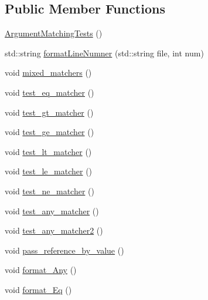 \subsection*{Public Member Functions}
\begin{DoxyCompactItemize}
\item 
\mbox{\hyperlink{structArgumentMatchingTests_a605a94720d45e2d2d1fec3cdd674c9f8}{Argument\+Matching\+Tests}} ()
\item 
std\+::string \mbox{\hyperlink{structArgumentMatchingTests_a7bb972e769e34e490cad0b68f4c780db}{format\+Line\+Numner}} (std\+::string file, int num)
\item 
void \mbox{\hyperlink{structArgumentMatchingTests_a8356a25840501e225661721b3b9f2007}{mixed\+\_\+matchers}} ()
\item 
void \mbox{\hyperlink{structArgumentMatchingTests_a3069b8bcc915ffba02ee51cff4094ca9}{test\+\_\+eq\+\_\+matcher}} ()
\item 
void \mbox{\hyperlink{structArgumentMatchingTests_aa570edf4798e7af66e7dce7eb685b6e8}{test\+\_\+gt\+\_\+matcher}} ()
\item 
void \mbox{\hyperlink{structArgumentMatchingTests_ab279feaddcf4e6ef3a44c6e2f4269b3f}{test\+\_\+ge\+\_\+matcher}} ()
\item 
void \mbox{\hyperlink{structArgumentMatchingTests_a9eb91d752ee6be842487d1203403d0c7}{test\+\_\+lt\+\_\+matcher}} ()
\item 
void \mbox{\hyperlink{structArgumentMatchingTests_a20a296df2ccfb6b2e980e7903d4d74ce}{test\+\_\+le\+\_\+matcher}} ()
\item 
void \mbox{\hyperlink{structArgumentMatchingTests_ac232cb4a48de7277eb8005c070ea4da1}{test\+\_\+ne\+\_\+matcher}} ()
\item 
void \mbox{\hyperlink{structArgumentMatchingTests_af100c7ba7d3e4d20ad2c0394b8ad0503}{test\+\_\+any\+\_\+matcher}} ()
\item 
void \mbox{\hyperlink{structArgumentMatchingTests_acd9b676723df946bafebdf9f43018a6e}{test\+\_\+any\+\_\+matcher2}} ()
\item 
void \mbox{\hyperlink{structArgumentMatchingTests_a31a8127f27c7dec2fb2f63f3289cae35}{pass\+\_\+reference\+\_\+by\+\_\+value}} ()
\item 
void \mbox{\hyperlink{structArgumentMatchingTests_aac5007027668bfd2576b7a331c859af0}{format\+\_\+\+Any}} ()
\item 
void \mbox{\hyperlink{structArgumentMatchingTests_a2eab8376e977ea99c1922d29014bdef5}{format\+\_\+\+Eq}} ()
\item 

\end{DoxyCompactItemize}
